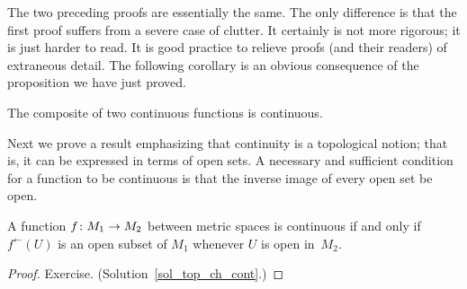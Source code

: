 The two preceding proofs are essentially the same. The only difference is that the first proof
suffers from a severe case of clutter. It certainly is not more rigorous; it is just harder to
read. It is good practice to relieve proofs (and their readers) of extraneous detail. The following
corollary is an obvious consequence of the proposition we have just proved.

\begin{cor}\label{cmp_cnt} The composite of two continuous functions is continuous.
\end{cor}

Next we prove a result emphasizing that continuity is a topological notion; that is, it can be
expressed in terms of open sets. A necessary and sufficient condition for a function to be
continuous is that the inverse image of every open set be open.

\begin{prop}\label{top_ch_cont} A function $f\colon M_1 \rightarrow M_2$ between metric spaces is
continuous if and only if $f^\gets(U)$ is an open subset of $M_1$ whenever $U$ is open in~$M_2$.
\end{prop}

\begin{proof} Exercise.  (Solution~\ref{sol_top_ch_cont}.)  \ns \end{proof}

